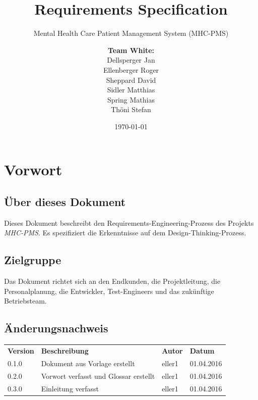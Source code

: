 \documentclass[a4paper]{scrreprt}
\title{Requirements Specification}
\subtitle{Mental Health Care Patient Management System (MHC-PMS)}
\author{
\begin{tabular}{l}
\normalfont\bfseries{Team White:}\\
Dellsperger Jan\\
Ellenberger Roger\\
Sheppard David\\
Sidler Matthias\\
Spring Mathias\\
Thöni Stefan
\end{tabular}
}
\date{\today}
\begin{document}
\begin{titlepage}
	\maketitle
\end{titlepage}


\tableofcontents


\chapter{Vorwort}


\section{Über dieses Dokument}
Dieses Dokument beschreibt den Requirements-Engineering-Prozess des Projekts \textit{MHC-PMS}. Es spezifiziert die Erkenntnisse auf dem Design-Thinking-Prozess.


\section{Zielgruppe}
Das Dokument richtet sich an den Endkunden, die Projektleitung, die Personalplanung, die Entwickler, Test-Engineers und das zukünftige Betriebsteam.


\section{Änderungsnachweis}
\begin{table}[h]
\label{tab_version-history}
\begin{tabular}{llll}
{\bf Version} & {\bf Beschreibung} 							& {\bf Autor} 	& {\bf Datum} \\
0.1.0         & Dokument aus Vorlage erstellt 				& eller1 		& 01.04.2016  \\
0.2.0         & Vorwort verfasst und Glossar erstellt		& eller1 		& 01.04.2016  \\
0.3.0         & Einleitung verfasst			                & eller1 		& 01.04.2016  \\

\end{tabular}
\end{table}
\end{document}
